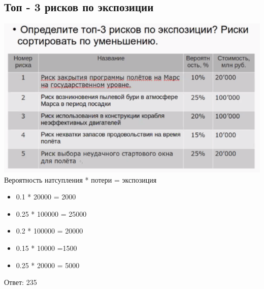 \documentclass{article}
\begin{document}
\subsection{Топ - 3 рисков по экспозиции}
\includegraphics[width=.4\textwidth]{risk.png}
\\
Вероятность натсупления * потери = экспозиция
\begin{itemize}
    \item 0.1 * 20000 = 2000
    \item 0.25 * 100000 = 25000
    \item 0.2 * 100000 = 20000
    \item 0.15 * 10000 =1500
    \item 0.25 * 20000 = 5000
\end{itemize}
Ответ: 235




\end{document}
